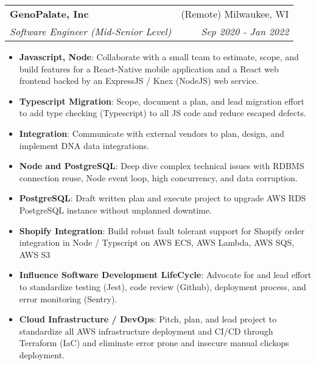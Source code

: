 \documentclass[letterpaper,11pt]{article}
\makeatletter
\newcommand{\resumeItem}[2]{
  \item\small{
    \textbf{#1}{: #2 \vspace{-2pt}}
  }
}
\newcommand{\resumeSubheading}[4]{
  \vspace{-1pt}\item
    \begin{tabular*}{0.97\textwidth}{l@{\extracolsep{\fill}}r}
      \textbf{#1} & #2 \\
      \textit{\small#3} & \textit{\small #4} \\
    \end{tabular*}\vspace{-5pt}
}
\newcommand{\resumeItemListStart}{\begin{itemize}}
\newcommand{\resumeItemListEnd}{\end{itemize}\vspace{-5pt}}
\makeatother
\begin{document}
    \resumeSubheading
      {GenoPalate, Inc}{(Remote) Milwaukee, WI}
      {Software Engineer (Mid-Senior Level)}{Sep 2020 - Jan 2022}
      \resumeItemListStart
        \resumeItem{Javascript, Node}
          {Collaborate with a small team to estimate, scope, and build features for a React-Native mobile application and a React web frontend backed by an ExpressJS / Knex (NodeJS) web service.}
        \resumeItem{Typescript Migration}
          {Scope, document a plan, and lead migration effort to add type checking (Typescript) to all JS code and reduce escaped defects.}
        \resumeItem{Integration}
          {Communicate with external vendors to plan, design, and implement DNA data integrations.}
        \resumeItem{Node and PostgreSQL}
          {Deep dive complex technical issues with RDBMS connection reuse, Node event loop, high concurrency, and data corruption.}
        \resumeItem{PostgreSQL}
          {Draft written plan and execute project to upgrade AWS RDS PostgreSQL instance without unplanned downtime.}
        \resumeItem{Shopify Integration}
          {Build robust fault tolerant support for Shopify order integration in Node / Typscript on AWS ECS, AWS Lambda, AWS SQS, AWS S3}
        \resumeItem{Influence Software Development LifeCycle}
          {Advocate for and lead effort to standardize testing (Jest), code review (Github), deployment process, and error monitoring (Sentry).}
        \resumeItem{Cloud Infrastructure / DevOps}
          {Pitch, plan, and lead project to standardize all AWS infrastructure deployment and CI/CD through Terraform (IaC) and eliminate error prone and insecure manual clickops deployment.}
      \resumeItemListEnd
\end{document}
